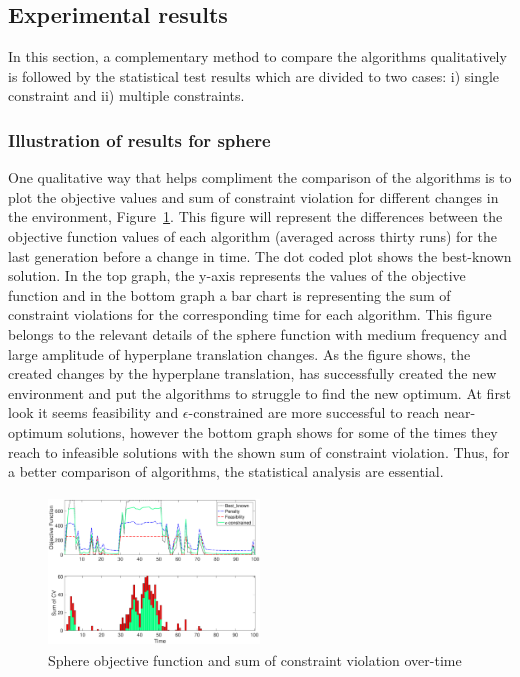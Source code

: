 \documentclass[conference]{IEEEtran}
\begin{document}
\subsection{Experimental results}
In this section, a complementary method to compare the algorithms qualitatively is followed by the statistical test results which are divided to two cases: i) single constraint and ii) multiple constraints. 

\subsubsection{Illustration of results for sphere}
One qualitative way that helps compliment the comparison of the algorithms is to plot the objective values and sum of constraint violation for different changes in the environment, Figure~\ref{fig:funcwsumcv}. 
This figure will represent the differences between the objective function values of each algorithm (averaged across thirty runs) for the last generation before a change in time. The dot coded plot shows the best-known solution.
In the top graph, the y-axis represents the values of the objective function and in the bottom graph a bar chart is representing the sum of constraint violations for the corresponding time for each algorithm. 
This figure belongs to the relevant details of the sphere function with medium frequency and large amplitude of hyperplane translation changes. As the figure shows, the created changes by the hyperplane translation, has successfully created the new environment and put the algorithms to struggle to find the new optimum. At first look it seems feasibility and $\epsilon$-constrained are more successful to reach near-optimum solutions, however the bottom graph shows for some of the times they reach to infeasible solutions with the shown sum of constraint violation. Thus, for a better comparison of algorithms, the statistical analysis are essential.

 \begin{figure}[t]
        \centering          \includegraphics[width=0.5\textwidth, height=4cm]{funcwsumcv.eps}  
        \caption[]
        {\scriptsize  Sphere objective function and sum of constraint violation over-time} 
        \label{fig:funcwsumcv}
    \end{figure}
    
\end{document}
